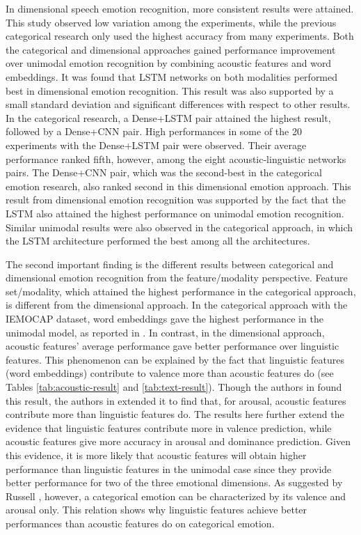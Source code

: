 In dimensional speech emotion recognition, more consistent results were
attained. This study observed low variation among the experiments, while the
previous categorical research only used the highest accuracy from many
experiments. Both the categorical and dimensional approaches gained performance
improvement over unimodal emotion recognition by combining acoustic features
and word embeddings.  It was found that LSTM networks on both modalities
performed best in dimensional emotion recognition.  This result was also
supported by a small standard deviation and significant differences with
respect to other results.  In the categorical research, a Dense+LSTM pair
attained the highest result, followed by a Dense+CNN pair. High performances in
some of the 20 experiments with the Dense+LSTM pair were observed. Their average
performance ranked fifth, however, among the eight acoustic-linguistic networks
pairs.  The Dense+CNN pair, which was the second-best in the categorical
emotion research, also ranked second in this dimensional emotion approach. This
result from dimensional emotion recognition was supported by the fact that the
LSTM also attained the highest performance on unimodal emotion recognition.
Similar unimodal results were also observed in the categorical approach, in
which the LSTM architecture performed the best among all the architectures.

The second important finding is the different results between categorical and
dimensional emotion recognition from the feature/modality perspective. Feature
set/modality, which attained the highest performance in the categorical
approach, is different from the dimensional approach. In the categorical
approach with the IEMOCAP dataset, word embeddings gave the highest performance
in the unimodal model, as reported in \cite{Atmaja2019b, Tripathi2018a,
Yoon2019, Sahu2019}. In contrast, in the dimensional approach, acoustic
features' average performance gave better performance over linguistic features.
This phenomenon can be explained by the fact that linguistic features (word
embeddings) contribute to valence more than acoustic features do (see Tables
\ref{tab:acoustic-result} and \ref{tab:text-result}). Though the authors in
\cite{Aldeneh2017} found this result, the authors in \cite{chen2017multimodal,
Eyben2010, Karadogan2012} extended it to find that, for arousal, acoustic
features contribute more than linguistic features do. The results here further
extend the evidence that linguistic features contribute more in valence
prediction, while acoustic features give more accuracy in arousal and dominance
prediction.  Given this evidence, it is more likely that acoustic features will
obtain higher performance than linguistic features in the unimodal case since
they provide better performance for two of the three emotional dimensions. As
suggested by Russell \cite{Russell1980a}, however, a categorical emotion can be
characterized by its valence and arousal only. This relation shows why
linguistic features achieve better performances than acoustic features do on
categorical emotion.

